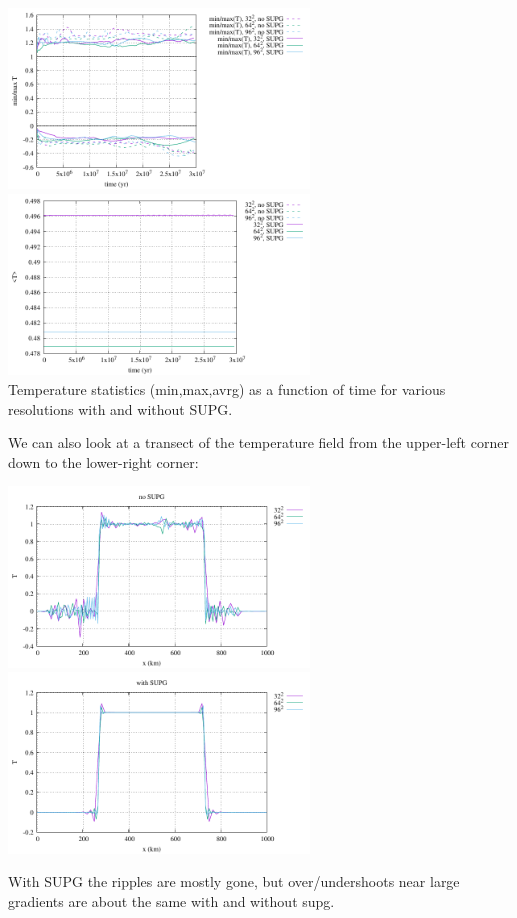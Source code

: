 \begin{center}
\includegraphics[width=8cm]{python_codes/fieldstone_43/results/experiment7/stats_T}
\includegraphics[width=8cm]{python_codes/fieldstone_43/results/experiment7/avrg_T}\\
{\captionfont Temperature statistics (min,max,avrg) as a function of time 
for various resolutions with and without SUPG.}
\end{center}

We can also look at a transect of the temperature field from the upper-left corner
down to the lower-right corner:

\begin{center}
\includegraphics[width=8cm]{python_codes/fieldstone_43/results/experiment7/diagonal}
\includegraphics[width=8cm]{python_codes/fieldstone_43/results/experiment7/diagonal_supg}
\end{center}
With SUPG the ripples are mostly gone, but over/undershoots near large gradients 
are about the same with and without supg.

